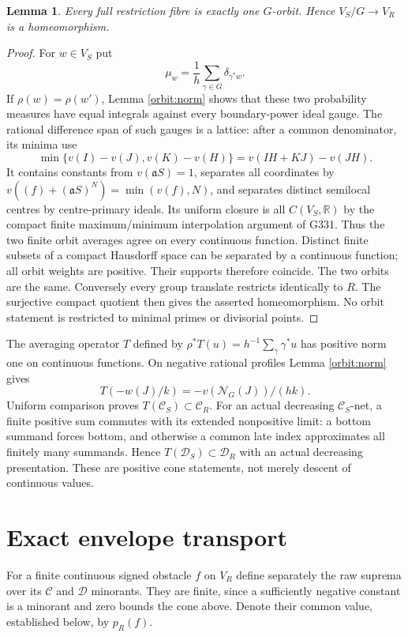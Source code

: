 \documentclass[11pt]{article}
\newtheorem{lemma}[theorem]{Lemma}
\newcommand{\C}{\mathcal C}
\newcommand{\D}{\mathcal D}
\newcommand{\aideal}{\mathfrak a}
\newcommand{\Nideal}{\mathcal N_G}
\newcommand{\R}{\mathbb R}
\begin{document}
\begin{lemma}\label{orbit:fibres}
Every full restriction fibre is exactly one $G$-orbit. Hence
$V_S/G\to V_R$ is a homeomorphism.
\end{lemma}
\begin{proof}
For $w\in V_S$ put
\[
 \mu_w=\frac1h\sum_{\gamma\in G}\delta_{\gamma^*w}.
\]
If $\rho(w)=\rho(w')$, Lemma \ref{orbit:norm} shows that these two
probability measures have equal integrals against every boundary-power
ideal gauge. The rational difference span of such gauges is a lattice:
after a common denominator, its minima use
\[
 \min\{v(I)-v(J),v(K)-v(H)\}=v(IH+KJ)-v(JH).
\]
It contains constants from $v(\aideal S)=1$, separates all coordinates
by $v((f)+(\aideal S)^N)=\min(v(f),N)$, and separates distinct
semilocal centres by centre-primary ideals. Its uniform closure is all
$C(V_S,\R)$ by the compact finite maximum/minimum interpolation
argument of G331. Thus the two finite orbit averages agree on every
continuous function. Distinct finite subsets of a compact Hausdorff space
can be separated by a continuous function; all orbit weights are positive.
Their supports therefore coincide. The two orbits are the same.
Conversely every group translate restricts identically to $R$. The
surjective compact quotient then gives the asserted homeomorphism.
No orbit statement is restricted to minimal primes or divisorial points.
\end{proof}

The averaging operator $T$ defined by $\rho^*T(u)=h^{-1}
\sum_{\gamma}\gamma^*u$ has positive norm one on continuous functions.
On negative rational profiles Lemma \ref{orbit:norm} gives
\[
 T(-w(J)/k)=-v(\Nideal(J))/(hk).
\]
Uniform comparison proves $T(\C_S)\subset\C_R$. For an actual
decreasing $\C_S$-net, a finite positive sum commutes with its extended
nonpositive limit: a bottom summand forces bottom, and otherwise a common
late index approximates all finitely many summands. Hence
$T(\D_S)\subset\D_R$ with an actual decreasing presentation. These
are positive cone statements, not merely descent of continuous values.

\section{Exact envelope transport}
For a finite continuous signed obstacle $f$ on $V_R$ define separately
the raw suprema over its $\C$ and $\D$ minorants. They are finite,
since a sufficiently negative constant is a minorant and zero bounds
the cone above. Denote their common value, established below, by $p_R(f)$.
\end{document}
